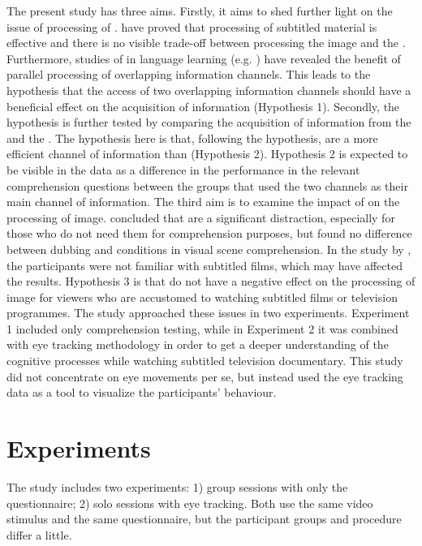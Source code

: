 \documentclass[output=paper]{langsci/langscibook}
\begin{document}
The present study has three aims. Firstly, it aims to shed further light on the issue of processing  of . \citet{Perego2010} have proved that processing of subtitled material is effective and there is no visible trade-off between processing the image and the . Furthermore, studies of  in language learning (e.g. \citealt{mitterer2009}) have revealed the benefit of parallel processing of overlapping information channels. This leads to the hypothesis that the access of two overlapping information channels should have a beneficial effect on the acquisition of information (Hypothesis 1). Secondly, the  hypothesis \citep{dydewalle1987} is further tested by comparing the acquisition of information from the  and the . The hypothesis here is that, following the  hypothesis,  are a more efficient channel of information than  (Hypothesis 2). Hypothesis 2 is expected to be visible in the data as a difference in the performance in the relevant comprehension questions between the groups that used the two channels as their main channel of information. The third aim is to examine the impact of  on the processing of image. \citet{lavaur2011} concluded that  are a significant distraction, especially for those who do not need them for comprehension purposes, but \citet{Perego2010} found no difference between dubbing and  conditions in visual scene comprehension. In the study by \citet{lavaur2011}, the participants were not familiar with subtitled films, which may have affected the results. Hypothesis 3 is that  do not have a negative effect on the processing of image for viewers who are accustomed to watching subtitled films or television programmes. The study approached these issues in two experiments. Experiment 1 included only comprehension testing, while in Experiment 2 it was combined with eye tracking methodology in order to get a deeper understanding of the cognitive processes while watching subtitled television documentary. This study did not concentrate on eye movements per se, but instead used the eye tracking data as a tool to visualize the participants' behaviour.

\section{Experiments}

The study includes two experiments: 1) group sessions with only the questionnaire; 2) solo sessions with eye tracking. Both use the same video stimulus and the same questionnaire, but the participant groups and procedure differ a little. 
\end{document}
